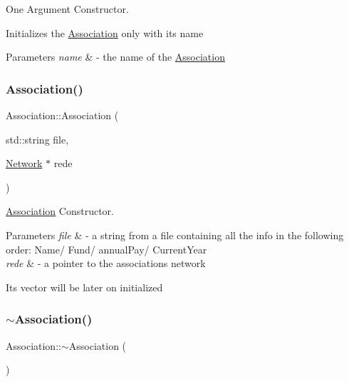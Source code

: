 One Argument Constructor. 

Initializes the \mbox{\hyperlink{classAssociation}{Association}} only with it\textquotesingle{}s name


\begin{DoxyParams}{Parameters}
{\em name} & -\/ the name of the \mbox{\hyperlink{classAssociation}{Association}} \\
\hline
\end{DoxyParams}
\mbox{\label{classAssociation_aaf75146fc564138ae2ae2430eb7926a2}} 
\subsubsection{\texorpdfstring{Association()}{Association()}\hspace{0.1cm}{\footnotesize\ttfamily [3/3]}}
{\footnotesize\ttfamily Association\+::\+Association (\begin{DoxyParamCaption}\item[{std\+::string}]{file,  }\item[{\mbox{\hyperlink{classNetwork}{Network}} $\ast$}]{rede }\end{DoxyParamCaption})}



\mbox{\hyperlink{classAssociation}{Association}} Constructor. 


\begin{DoxyParams}{Parameters}
{\em file} & -\/ a string from a file containing all the info in the following order\+: Name/ Fund/ annual\+Pay/ Current\+Year \\
\hline
{\em rede} & -\/ a pointer to the association\textquotesingle{}s network\\
\hline
\end{DoxyParams}
It\textquotesingle{}s vector will be later on initialized \mbox{\label{classAssociation_adc0ad6a21b904d08c1d392550df9da59}} 
\subsubsection{\texorpdfstring{$\sim$\+Association()}{~Association()}}
{\footnotesize\ttfamily Association\+::$\sim$\+Association (\begin{DoxyParamCaption}{ }\end{DoxyParamCaption})\hspace{0.3cm}{\ttfamily [virtual]}}



